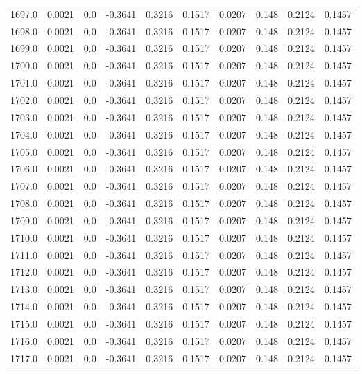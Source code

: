 \begin{longtable}{lrrrrrrrrr}
1697.0 & 0.0021 & 0.0 & -0.3641 & 0.3216 & 0.1517 & 0.0207 & 0.148 & 0.2124 & 0.1457 \\
1698.0 & 0.0021 & 0.0 & -0.3641 & 0.3216 & 0.1517 & 0.0207 & 0.148 & 0.2124 & 0.1457 \\
1699.0 & 0.0021 & 0.0 & -0.3641 & 0.3216 & 0.1517 & 0.0207 & 0.148 & 0.2124 & 0.1457 \\
1700.0 & 0.0021 & 0.0 & -0.3641 & 0.3216 & 0.1517 & 0.0207 & 0.148 & 0.2124 & 0.1457 \\
1701.0 & 0.0021 & 0.0 & -0.3641 & 0.3216 & 0.1517 & 0.0207 & 0.148 & 0.2124 & 0.1457 \\
1702.0 & 0.0021 & 0.0 & -0.3641 & 0.3216 & 0.1517 & 0.0207 & 0.148 & 0.2124 & 0.1457 \\
1703.0 & 0.0021 & 0.0 & -0.3641 & 0.3216 & 0.1517 & 0.0207 & 0.148 & 0.2124 & 0.1457 \\
1704.0 & 0.0021 & 0.0 & -0.3641 & 0.3216 & 0.1517 & 0.0207 & 0.148 & 0.2124 & 0.1457 \\
1705.0 & 0.0021 & 0.0 & -0.3641 & 0.3216 & 0.1517 & 0.0207 & 0.148 & 0.2124 & 0.1457 \\
1706.0 & 0.0021 & 0.0 & -0.3641 & 0.3216 & 0.1517 & 0.0207 & 0.148 & 0.2124 & 0.1457 \\
1707.0 & 0.0021 & 0.0 & -0.3641 & 0.3216 & 0.1517 & 0.0207 & 0.148 & 0.2124 & 0.1457 \\
1708.0 & 0.0021 & 0.0 & -0.3641 & 0.3216 & 0.1517 & 0.0207 & 0.148 & 0.2124 & 0.1457 \\
1709.0 & 0.0021 & 0.0 & -0.3641 & 0.3216 & 0.1517 & 0.0207 & 0.148 & 0.2124 & 0.1457 \\
1710.0 & 0.0021 & 0.0 & -0.3641 & 0.3216 & 0.1517 & 0.0207 & 0.148 & 0.2124 & 0.1457 \\
1711.0 & 0.0021 & 0.0 & -0.3641 & 0.3216 & 0.1517 & 0.0207 & 0.148 & 0.2124 & 0.1457 \\
1712.0 & 0.0021 & 0.0 & -0.3641 & 0.3216 & 0.1517 & 0.0207 & 0.148 & 0.2124 & 0.1457 \\
1713.0 & 0.0021 & 0.0 & -0.3641 & 0.3216 & 0.1517 & 0.0207 & 0.148 & 0.2124 & 0.1457 \\
1714.0 & 0.0021 & 0.0 & -0.3641 & 0.3216 & 0.1517 & 0.0207 & 0.148 & 0.2124 & 0.1457 \\
1715.0 & 0.0021 & 0.0 & -0.3641 & 0.3216 & 0.1517 & 0.0207 & 0.148 & 0.2124 & 0.1457 \\
1716.0 & 0.0021 & 0.0 & -0.3641 & 0.3216 & 0.1517 & 0.0207 & 0.148 & 0.2124 & 0.1457 \\
1717.0 & 0.0021 & 0.0 & -0.3641 & 0.3216 & 0.1517 & 0.0207 & 0.148 & 0.2124 & 0.1457 \\

\end{longtable}
